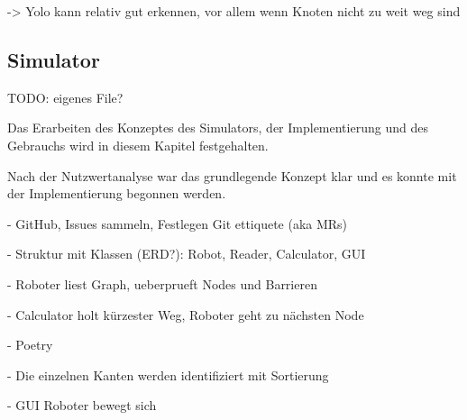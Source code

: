 -> Yolo kann relativ gut erkennen, vor allem wenn Knoten nicht zu weit weg sind

\subsection{Simulator}

TODO: eigenes File?

Das Erarbeiten des Konzeptes des Simulators, der Implementierung und des Gebrauchs wird in diesem Kapitel festgehalten.

Nach der Nutzwertanalyse war das grundlegende Konzept klar und es konnte mit der Implementierung begonnen werden.

- GitHub, Issues sammeln, Festlegen Git ettiquete (aka MRs)

- Struktur mit Klassen (ERD?): Robot, Reader, Calculator, GUI

- Roboter liest Graph, ueberprueft Nodes und Barrieren

- Calculator holt kürzester Weg, Roboter geht zu nächsten Node

- Poetry

- Die einzelnen Kanten werden identifiziert mit Sortierung

- GUI Roboter bewegt sich
